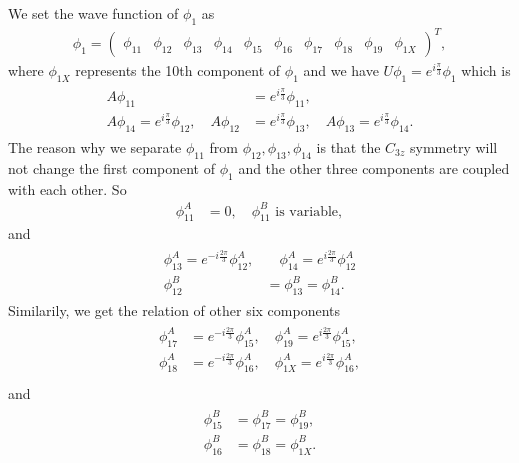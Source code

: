 \documentclass[10pt, oneside]{article}
\newcommand{\ph}{\phi}
\begin{document}
We set the wave function of \(\phi_1\) as 
\begin{align}
	\ph_1 = \begin{pmatrix}
		\ph_{11} & \ph_{12} & \ph_{13} & \ph_{14} & \ph_{15} & \ph_{16} & \ph_{17} & \ph_{18} & \ph_{19} & \ph_{1X}
	\end{pmatrix}^{T},
\end{align}
where \(\ph_{1X}\) represents the 10th component of \(\ph_1\) and we have \(U \ph_1 = e^{i \frac{\pi}{3}} \ph_1\) which is 
\begin{align}
	\begin{split}
		A \ph_{11}  &= e^{i \frac{\pi}{3}} \ph_{11}, \\
		A \ph_{14}  = e^{i \frac{\pi}{3}} \ph_{12}, \quad A \ph_{12} &= e^{i \frac{\pi}{3}} \ph_{13}, \quad A \ph_{13} = e^{i \frac{\pi}{3}} \ph_{14}.
	\end{split}
\end{align}
The reason why we separate \(\ph_{11}\) from \(\ph_{12}, \ph_{13}, \ph_{14}\) is that the \(C_{3z}\) symmetry will not change the first component of \(\ph_1\) and the other three components are coupled with each other. So 
\begin{align}
		\ph_{11}^{A} &= 0,  \quad \ph_{11}^{B} \,\, \text{is variable}, 
\end{align}
and 
\begin{align}
	\begin{split}
		\ph_{13}^{A} = e^{-i \frac{2\pi}{3}} \ph_{12}^{A},&\quad \ph_{14}^{A} = e^{i \frac{2\pi}{3}} \ph_{12}^{A} \\
		\ph_{12}^{B} & = \ph_{13}^{B} = \ph_{14}^{B}.
	\end{split}
\end{align}
Similarily, we get the relation of other six components 
\begin{align}
	\begin{split}
		\ph_{17}^{A} &= e^{-i \frac{2 \pi}{3}} \ph_{15}^{A},\quad \ph_{19}^{A} = e^{i \frac{2 \pi}{3}} \ph_{15}^{A}, \\
		\ph_{18}^{A} &= e^{-i \frac{2 \pi}{3}} \ph_{16}^{A}, \quad \ph_{1X}^{A} = e^{i \frac{2 \pi}{3}} \ph_{16}^{A}, \\
	\end{split}
\end{align}
and 
\begin{align}
	\begin{split}
		\ph_{15}^{B} &= \ph_{17}^{B} = \ph_{19}^{B}, \\
		\ph_{16}^{B} &= \ph_{18}^{B} = \ph_{1X}^{B}.
	\end{split}
\end{align}
\end{document}
